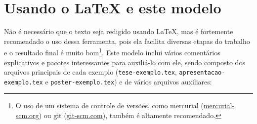 \chapter{Usando o \LaTeX{} e este modelo}

Não é necessário que o texto seja redigido usando \LaTeX{}, mas é fortemente
recomendado o uso dessa ferramenta, pois ela facilita diversas etapas do
trabalho e o resultado final é muito bom\footnote{O uso de um sistema de
controle de versões, como mercurial (\url{mercurial-scm.org}) ou git
(\url{git-scm.com}), também é altamente recomendado.}. Este modelo inclui
vários comentários explicativos e pacotes interessantes para auxiliá-lo com
ele, sendo composto dos arquivos principais de cada exemplo
(\texttt{tese-exemplo.tex}, \texttt{apresentacao-exemplo.tex} e
\texttt{poster-exemplo.tex}) e de vários arquivos auxiliares:

